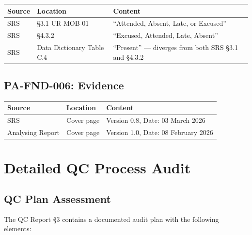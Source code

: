 \documentclass[11pt,a4paper]{article}
\begin{document}
\begin{table}[H]
\centering\small
\begin{tabular}{|l|L{3cm}|>{\RaggedRight\arraybackslash}m{6.5cm}|}
\hline
{}
\textbf{Source} & \textbf{Location} & \textbf{Content} \\\hline
SRS & \S3.1 UR-MOB-01 & ``Attended, Absent, Late, or Excused'' \\\hline
SRS & \S4.3.2 & ``Excused, Attended, Late, Absent'' \\\hline
SRS & Data Dictionary Table C.4 & ``Present'' --- diverges from both SRS \S3.1 and \S4.3.2 \\\hline
\end{tabular}
\end{table}

\subsection{PA-FND-006: Evidence}

\begin{table}[H]
\centering\small
\begin{tabular}{|l|L{3cm}|>{\RaggedRight\arraybackslash}m{6.5cm}|}
\hline
{}
\textbf{Source} & \textbf{Location} & \textbf{Content} \\\hline
SRS & Cover page & Version 0.8, Date: 03 March 2026 \\\hline
Analysing Report & Cover page & Version 1.0, Date: 08 February 2026 \\\hline
\end{tabular}
\end{table}

\clearpage
\renewcommand{\appendixprefix}{C}
\setcounter{page}{1}
\section{Detailed QC Process Audit}
\label{app:qc-detail}

\subsection{QC Plan Assessment}

The QC Report \S3 contains a documented audit plan with the following elements:
\end{document}
